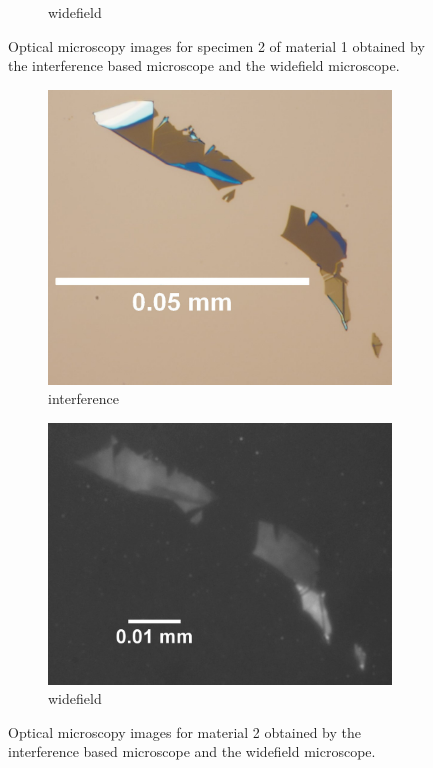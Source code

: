 \begin{figure}[H]
\begin{subfigure}{0.4\textwidth}
        \caption{widefield}
	      \label{fig_mono_spec2_wide}
    \end{subfigure}
    \caption{Optical microscopy images for specimen 2 of material 1 obtained by the interference based microscope and the widefield microscope.}
	\label{fig_mono_spec2} %
\end{figure}

\begin{figure}[H]
    \centering
    \begin{subfigure}{0.4\textwidth}
        \centering
        \includegraphics[width=1.0\textwidth]{img/output_t1/M2_1_100_adj}
        \caption{interference}
	      \label{fig_mono_spec3_int}
    \end{subfigure}
    \begin{subfigure}{0.49\textwidth}
        \centering
        \includegraphics[width=\textwidth]{img/output_t1/M2_1_50_adj_photo4}
        \caption{widefield}
	      \label{fig_mono_spec3_wide}
    \end{subfigure}
    \caption{Optical microscopy images for material 2 obtained by the interference based microscope and the widefield microscope.}
	\label{fig_mono_spec3} %
\end{figure}

